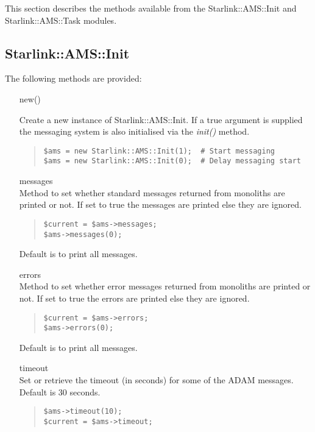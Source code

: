 \documentclass[twoside,11pt]{article}
\newenvironment{myquote}{\begin{quote}\begin{small}}{\end{small}\end{quote}}
\renewcommand{\_}{\texttt{\symbol{95}}}
\begin{document}
This section describes the methods available from the Starlink::AMS::Init
and Starlink::AMS::Task modules.

\subsection{Starlink::AMS::Init}

The following methods are provided:

\begin{itemize}

\item[new()]%
%

Create a new instance of Starlink::AMS::Init.
If a true argument is supplied the messaging system is also
initialised via the {\em init()\/} method.

\begin{myquote}
\begin{verbatim}
$ams = new Starlink::AMS::Init(1);  # Start messaging
$ams = new Starlink::AMS::Init(0);  # Delay messaging start
\end{verbatim}
\end{myquote}


\item[messages]%
%
\hfill\\
Method to set whether standard messages returned from monoliths
are printed or not. If set to true the messages are printed
else they are ignored.

\begin{myquote}
\begin{verbatim}
$current = $ams->messages;
$ams->messages(0);
\end{verbatim}
\end{myquote}

Default is to print all messages.

\item[errors]%
%
\hfill\\
Method to set whether error messages returned from monoliths
are printed or not. If set to true the errors are printed
else they are ignored.
\begin{myquote}
\begin{verbatim}
$current = $ams->errors;
$ams->errors(0);
\end{verbatim}
\end{myquote}

Default is to print all messages.

\item[timeout]%
%
\hfill\\
Set or retrieve the timeout (in seconds) for some of the ADAM messages.
Default is 30 seconds.
\begin{myquote}
\begin{verbatim}
$ams->timeout(10);
$current = $ams->timeout;
\end{verbatim}
\end{myquote}


\end{itemize}
\end{document}
